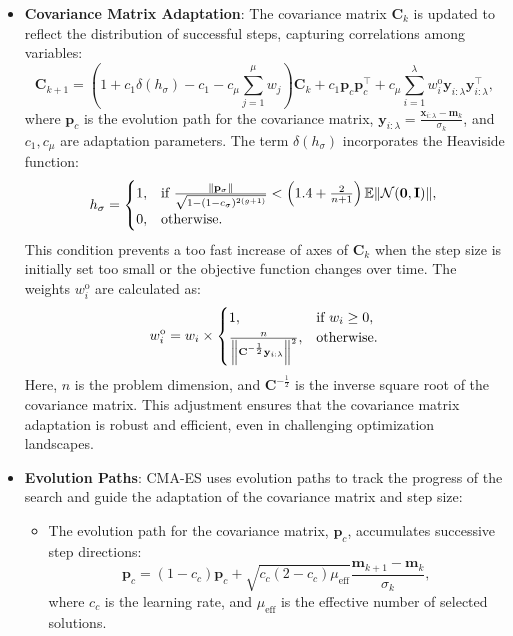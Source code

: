 \begin{itemize}
    \item \textbf{Covariance Matrix Adaptation}: The covariance matrix \(\mathbf{C}_k\) is updated to reflect the distribution of successful steps, capturing correlations among variables:
    \begin{equation*}
    \mathbf{C}_{k+1} = (1 + c_1 \delta(h_\sigma) - c_1 - c_\mu \sum_{j=1}^\mu w_j) \mathbf{C}_k + c_1 \mathbf{p}_c \mathbf{p}_c^\top + c_\mu \sum_{i=1}^\lambda w_i^\text{o} \mathbf{y}_{i:\lambda} \mathbf{y}_{i:\lambda}^\top,
    \end{equation*}
    where \(\mathbf{p}_c\) is the evolution path for the covariance matrix, \(\mathbf{y}_{i:\lambda} = \frac{\mathbf{x}_{i:\lambda} - \mathbf{m}_k}{\sigma_k}\), and \(c_1, c_\mu\) are adaptation parameters. The term \(\delta(h_\sigma)\) incorporates the Heaviside function:
    \begin{equation*}
    h_\sigma = 
    \begin{cases}
    1, & \text{if } \frac{\norm{\mathbf{p}_\sigma}}{\sqrt{1 - (1 - c_\sigma)^{2(g+1)}}} < \left(1.4 + \frac{2}{n+1}\right) \mathbb{E} \norm{\mathcal{N}(\mathbf{0}, \mathbf{I})}, \\
    0, & \text{otherwise}.
    \end{cases}
    \end{equation*}
    This condition prevents a too fast increase of axes of \(\mathbf{C}_k\) when the step size is initially set too small or the objective function changes over time. The weights \(w_i^\text{o}\) are calculated as:  
    \begin{equation*}
    w_i^\text{o} = w_i \times 
    \begin{cases} 
    1, & \text{if } w_i \geq 0, \\ 
    \frac{n}{\norm{\mathbf{C}^{-\frac{1}{2}} \mathbf{y}_{i:\lambda}}^2}, & \text{otherwise}.
    \end{cases}
    \end{equation*}
    Here, \(n\) is the problem dimension, and \(\mathbf{C}^{-\frac{1}{2}}\) is the inverse square root of the covariance matrix. This adjustment ensures that the covariance matrix adaptation is robust and efficient, even in challenging optimization landscapes.

    
    \item \textbf{Evolution Paths}: CMA-ES uses evolution paths to track the progress of the search and guide the adaptation of the covariance matrix and step size:
    \begin{itemize}
        \item The evolution path for the covariance matrix, \(\mathbf{p}_c\), accumulates successive step directions:
        \begin{equation*}
        \mathbf{p}_c = (1 - c_c) \mathbf{p}_c + \sqrt{c_c (2 - c_c) \mu_\text{eff}} \frac{\mathbf{m}_{k+1} - \mathbf{m}_k}{\sigma_k},
        \end{equation*}
        where \(c_c\) is the learning rate, and \(\mu_\text{eff}\) is the effective number of selected solutions.
        

\end{itemize}
\end{itemize}

